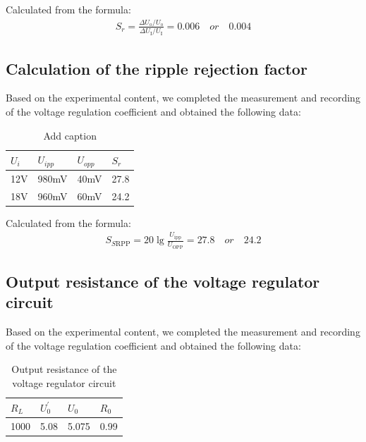 \documentclass[UTF8]{article}
\begin{document}
   Calculated from the formula:
       \begin{eqnarray}
       S_{r}=\frac{\Delta U_{\mathrm{o}} / U_{\mathrm{o}}}{\Delta U_{\mathrm{I}} / U_{\mathrm{I}}} =0.006 \quad or \quad 0.004
       \end{eqnarray}
       
   \subsection{Calculation of the ripple rejection factor}
    Based on the experimental content, we completed the measurement and recording of the voltage regulation coefficient and obtained the following data:
    
  \begin{table}[htbp]
    \centering
    \caption{Add caption}
      \begin{tabular}{lllr}
      \toprule[2pt]
      $U_i$  & $U_{ipp}$ & $U_{opp}$ & \multicolumn{1}{l}{$S_r$} \\
      \midrule
      12V   & 980mV & 40mV  & 27.8 \\
      18V   & 960mV & 60mV  & 24.2 \\
      \bottomrule[2pt]
      \end{tabular}%
    \label{tab:addlabel}%
  \end{table}%
    
   Calculated from the formula:
       \begin{eqnarray}
       S_{S \mathrm{RPP}}=20 \lg \frac{U_{\mathrm{ipp}}}{U_{\mathrm{OPP}}} = 27.8\quad or \quad 24.2
       \end{eqnarray}
       
   \subsection{Output resistance of the voltage regulator circuit}
   Based on the experimental content, we completed the measurement and recording of the voltage regulation coefficient and obtained the following data:
   
   \begin{table}[htbp]
     \centering
     \caption{Output resistance of the voltage regulator circuit}
       \begin{tabular}{rrrr}
        \toprule[2pt]
       \multicolumn{1}{l}{$R_L$} & \multicolumn{1}{l}{$U_{0}^{'}$} & \multicolumn{1}{l}{$U_0$} & \multicolumn{1}{l}{$R_0$} \\
       \midrule
       1000  & 5.08  & 5.075 & 0.99 \\
        \bottomrule[2pt]
       \end{tabular}%
     \label{tab:addlabel3}%
   \end{table}%
   
\end{document}
